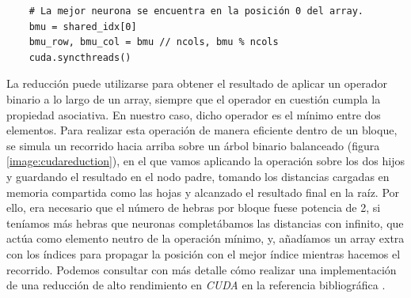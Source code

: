 \begin{code}
\begin{verbatim}
    # La mejor neurona se encuentra en la posición 0 del array.
    bmu = shared_idx[0]
    bmu_row, bmu_col = bmu // ncols, bmu % ncols
    cuda.syncthreads()
\end{verbatim}
\label{code:somiter2}
\end{code}
  
La reducción puede utilizarse para obtener el resultado de aplicar un operador binario a lo largo de un array, siempre que el operador en cuestión cumpla la propiedad asociativa. En nuestro caso, dicho operador es el mínimo entre dos elementos. Para realizar esta operación de manera eficiente dentro de un bloque, se simula un recorrido hacia arriba sobre un árbol binario balanceado (figura \ref{image:cudareduction}), en el que vamos aplicando la operación sobre los dos hijos y guardando el resultado en el nodo padre, tomando los distancias cargadas en memoria compartida como las hojas y alcanzado el resultado final en la raíz. Por ello, era necesario que el número de hebras por bloque fuese potencia de 2, si teníamos más hebras que neuronas completábamos las distancias con infinito, que actúa como elemento neutro de la operación mínimo, y, añadíamos un array extra con los índices para propagar la posición con el mejor índice mientras hacemos el recorrido. Podemos consultar con más detalle cómo realizar una implementación de una reducción de alto rendimiento en \textit{CUDA} en la referencia bibliográfica \cite{reduction}.\\


